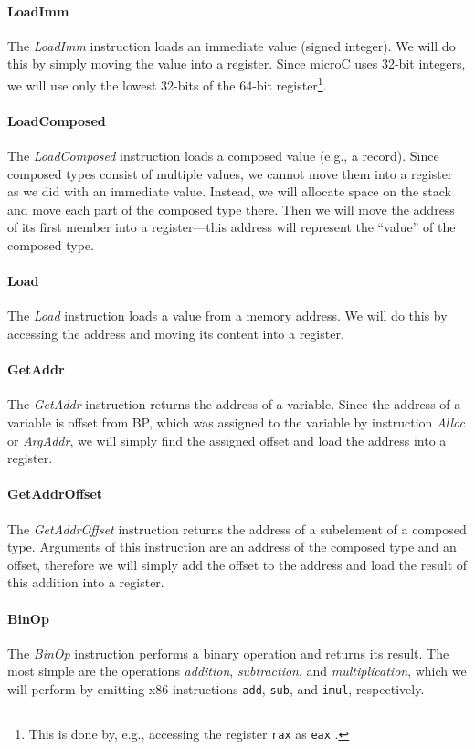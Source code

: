 \documentclass[thesis=M,english]{FITthesis}[2019/12/23]
\begin{document}
\paragraph*{LoadImm} The \emph{LoadImm} instruction loads an immediate value (signed integer). We will do this by simply moving the value into a register. Since microC uses 32-bit integers, we will use only the lowest 32-bits of the 64-bit register\footnote{This is done by, e.g., accessing the register \texttt{rax} as \texttt{eax} \cite[Chap. 2.3.1.1]{x86_assembly}.}. 

\paragraph*{LoadComposed} The \emph{LoadComposed} instruction loads a composed value (e.g., a record). Since composed types consist of multiple values, we cannot move them into a register as we did with an immediate value. Instead, we will allocate space on the stack and move each part of the composed type there. Then we will move the address of its first member into a register---this address will represent the “value” of the composed type.

\paragraph*{Load} The \emph{Load} instruction loads a value from a memory address. We will do this by accessing the address and moving its content into a register.

\paragraph*{GetAddr} The \emph{GetAddr} instruction returns the address of a variable. Since the address of a variable is offset from BP, which was assigned to the variable by instruction \emph{Alloc} or \emph{ArgAddr}, we will simply find the assigned offset and load the address into a register.

\paragraph*{GetAddrOffset} The \emph{GetAddrOffset} instruction returns the address of a sub\-element of a composed type. Arguments of this instruction are an address of the composed type and an offset, therefore we will simply add the offset to the address and load the result of this addition into a register.

\paragraph*{BinOp} The \emph{BinOp} instruction performs a binary operation and returns its result. The most simple are the operations \emph{addition}, \emph{subtraction}, and \emph{multiplication}, which we will perform by emitting x86 instructions \texttt{add}, \texttt{sub}, and \texttt{imul}, respectively.
\end{document}
